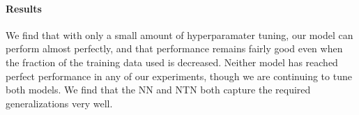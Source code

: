 \paragraph{Results} 
We find that with only a small amount of hyperparamater tuning, our model can perform almost perfectly, and that performance remains fairly good even when the fraction of the training data used is decreased. Neither model has reached perfect performance in any of our experiments, though we are continuing to tune both models. We find that the NN and NTN both capture the required generalizations very well.


\begin{table}[h]
\centering{}
 \caption{Test (train) accuracy figures on the WordNet data. The baseline figure is simply the frequency of the most frequent class, .\label{b-table}}  
\end{table}

